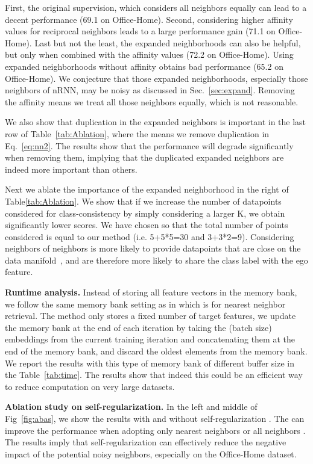 \documentclass{article}
\begin{document}
First, the original supervision, which considers all neighbors equally can lead to a decent performance (69.1 on Office-Home). 
Second, considering higher affinity values for reciprocal neighbors leads to a large performance gain (71.1 on Office-Home). Last but not the least, the expanded neighborhoods can also be helpful, but only when combined with the affinity values  (72.2 on Office-Home). 
Using expanded neighborhoods without affinity obtains bad performance (65.2 on Office-Home). We conjecture that those expanded neighborhoods, especially those neighbors of nRNN, may be noisy as discussed in Sec.~\ref{sec:expand}. Removing the affinity  means we treat all those neighbors equally, which is not reasonable.


We also show that duplication in the expanded neighbors is important in the last row of Table~\ref{tab:Ablation}, where the  means we remove duplication in Eq.~\ref{eq:nn2}. The results show that the performance will degrade significantly when removing them, implying that the duplicated expanded neighbors are indeed more important than others.


Next we ablate the importance of the expanded neighborhood in the right of Table\ref{tab:Ablation}. We show that if we increase the number of datapoints considered for class-consistency by simply considering a larger K, we obtain significantly lower scores. We have chosen  so that the total number of points considered is equal to our method (i.e. 5+5*5=30 and 3+3*2=9).
Considering neighbors of neighbors is more likely to provide datapoints that are close on the data manifold~\cite{tenenbaum2000global}, and are therefore more likely to share the class label with the ego feature. 


{\noindent \textbf{Runtime analysis.}  Instead of storing all feature vectors in the memory bank, we follow the same memory bank setting as in \cite{dwibedi2021little} which is for nearest neighbor retrieval. The method only stores a fixed number of target features, we update the memory bank at the end of each iteration by taking the  (batch size) embeddings from the current training iteration and concatenating them at the end of the memory bank, and discard the oldest  elements from the memory bank. We report the results with this type of memory bank of different buffer size in the Table~\ref{tab:time}. The results show that indeed this could be an efficient way to reduce computation on very large datasets.}

\noindent \textbf{Ablation study on self-regularization.} In the left and middle of Fig~\ref{fig:abas}, we show the results with and without self-regularization . The  can improve the performance when adopting only nearest neighbors  or all neighbors . The results imply that self-regularization can effectively reduce the negative impact of the potential noisy neighbors, especially on the Office-Home dataset.
\end{document}

